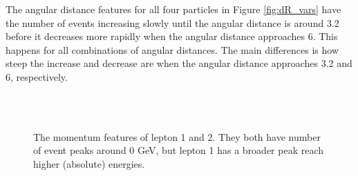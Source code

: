 \documentclass[a4paper, american, 12pt]{report}
\begin{document}
	The angular distance features for all four particles in Figure \ref{fig:dR_vars} have the number of events increasing slowly until the angular distance is around 3.2 before it decreases more rapidly when the angular distance approaches 6. This happens for all combinations of angular distances. The main differences is how steep the increase and decrease are when the angular distance approaches 3.2 and 6, respectively. 
	\begin{figure}[h!]
		\vspace*{-4.5cm}
		\hspace*{-1.cm}
		\\
		\hspace*{-1.cm}
		\\
		\hspace*{-1.cm}
		\caption[The momentum for lepton 1 and 2.]{The momentum features of lepton 1 and 2. They both have number of event peaks around 0 GeV, but lepton 1 has a broader peak reach higher (absolute) energies. \label{fig:P_12}}
	\end{figure}
\end{document}
